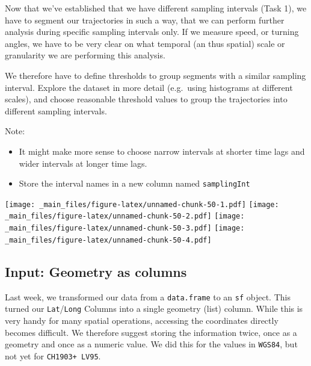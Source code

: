 \documentclass[]{book}
\providecommand{\tightlist}{%
  \setlength{\itemsep}{0pt}\setlength{\parskip}{0pt}}
\theoremstyle{definition}
\theoremstyle{definition}
\theoremstyle{definition}
\theoremstyle{remark}
\begin{document}
Now that we've established that we have different sampling intervals
(Task 1), we have to segment our trajectories in such a way, that we can
perform further analysis during specific sampling intervals only. If we
measure speed, or turning angles, we have to be very clear on what
temporal (an thus spatial) scale or granularity we are performing this
analysis.

We therefore have to define thresholds to group segments with a similar
sampling interval. Explore the dataset in more detail (e.g.~using
histograms at different scales), and choose reasonable threshold values
to group the trajectories into different sampling intervals.

Note:

\begin{itemize}
\tightlist
\item
  It might make more sense to choose narrow intervals at shorter time
  lags and wider intervals at longer time lags.
\item
  Store the interval names in a new column named \texttt{samplingInt}
\end{itemize}

\texttt{[image: \_main\_files/figure-latex/unnamed-chunk-50-1.pdf]}
\texttt{[image: \_main\_files/figure-latex/unnamed-chunk-50-2.pdf]}
\texttt{[image: \_main\_files/figure-latex/unnamed-chunk-50-3.pdf]}
\texttt{[image: \_main\_files/figure-latex/unnamed-chunk-50-4.pdf]}

\subsection{Input: Geometry as columns}\label{input-geometry-as-columns}

Last week, we transformed our data from a \texttt{data.frame} to an
\texttt{sf} object. This turned our \texttt{Lat}/\texttt{Long} Columns
into a single geometry (list) column. While this is very handy for many
spatial operations, accessing the coordinates directly becomes
difficult. We therefore suggest storing the information twice, once as a
geometry and once as a numeric value. We did this for the values in
\texttt{WGS84}, but not yet for \texttt{CH1903+\ LV95}.
\end{document}
